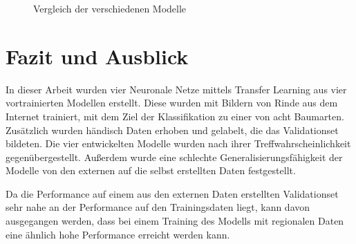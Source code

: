 \documentclass{article}
\begin{document}
\begin{figure}[h!]
  \centering
  \caption{Vergleich der verschiedenen Modelle}
  \label{vergleich}
\end{figure}

\FloatBarrier

\section{Fazit und Ausblick}

In dieser Arbeit wurden vier Neuronale Netze mittels Transfer Learning aus vier vortrainierten Modellen erstellt. Diese wurden mit Bildern von Rinde aus dem Internet trainiert, mit dem Ziel der Klassifikation zu einer von acht Baumarten. Zusätzlich wurden händisch Daten erhoben und gelabelt, die das Validationset bildeten. Die vier entwickelten Modelle wurden nach ihrer Treffwahrscheinlichkeit gegenübergestellt. Außerdem wurde eine schlechte Generalisierungsfähigkeit der Modelle von den externen auf die selbst erstellten Daten festgestellt.

Da die Performance auf einem aus den externen Daten erstellten Validationset sehr nahe an der Performance auf den Trainingsdaten liegt, kann davon ausgegangen werden, dass bei einem Training des Modells mit regionalen Daten eine ähnlich hohe Performance erreicht werden kann.
\end{document}
